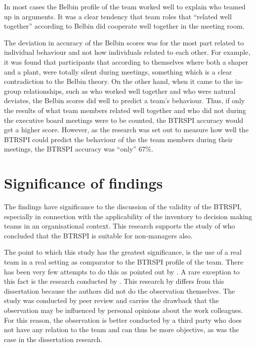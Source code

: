 \documentclass[a4paper,12pt,titlepage]{report}
\begin{document}
  In most cases the Belbin profile of the team worked well to explain who
  teamed up in arguments. It was a clear tendency that team roles that
  ``related well together'' according to Belbin did cooperate well together in the
  meeting room.

  The deviation in accuracy of the Belbin scores was for the most part related to
  individual behaviour and not how individuals related to each other. For example,
  it was found that participants that according to themselves where both a shaper
  and a plant, were totally silent during meetings, something which is a clear
  contradiction to the Belbin theory. On the other hand, when it came to the in-group
  relationships, such as who worked well together and who were natural deviates,
  the Belbin scores did well to predict a team's behaviour. Thus, if only
  the results of what team members related well together and who did not
  during the executive board meetings were to be counted, the
  BTRSPI accuracy would get a higher score. However, as the research
  was set out to measure how well the BTRSPI could predict the behaviour of the
  the team members during their meetings, the BTRSPI accuracy was ``only'' 67\%.

  \section{Significance of findings}
  The findings have significance to the discussion of the validity of
  the BTRSPI, especially in connection with the applicability of the inventory
  to decision making teams in an organisational context. This research supports
  the study of \citet{sfthwm3} who concluded that the BTRSPI is suitable for
  non-managers also.

  The point to which this study has the greatest significance, is the
  use of a real team in a real setting as comparator to the BTRSPI profile
  of the team. There has been very few attempts to do this as pointed
  out by \citet{dphh}. A rare exception to this fact is the research
  conducted by \citet{bsss}. This research by \citet{bsss} differs from this
  dissertation because the authors did not do the
  observation themselves. The study was conducted by
  peer review and carries the drawback that the observation
  may be influenced by personal opinions about the work colleagues. For this
  reason, the observation is better conducted by a third party who does
  not have any relation to the team and can thus be more objective,
  as was the case in the dissertation research.
\end{document}
